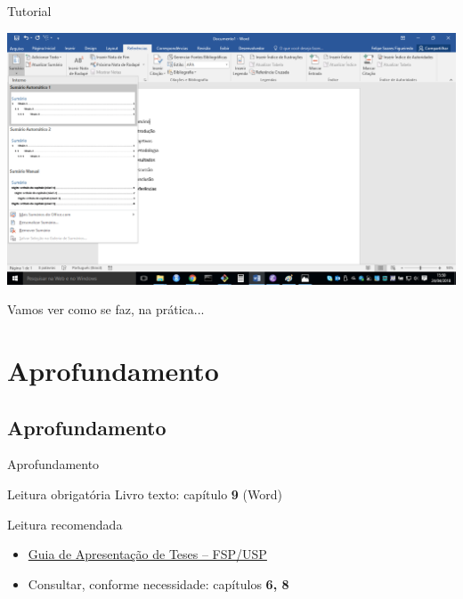 \documentclass{beamer}
\begin{document}
\begin{frame}{\scriptsize Tutorial}
  \begin{center}
    \includegraphics[width=\textwidth]{EstruturaII/sumario2}
  \end{center}
\end{frame}

\begin{frame}{\scriptsize }
  \begin{block}{}
    \Large
    Vamos ver como se faz, na prática...
  \end{block}
\end{frame}

\section{Aprofundamento}

\subsection{Aprofundamento}

\begin{frame}{Aprofundamento}
  \begin{block}{Leitura obrigatória}
    Livro texto: capítulo {\bf 9} (Word)
  \end{block}
  \bigskip
  \begin{block}{Leitura recomendada}
    \begin{itemize}
      \footnotesize
    \item \href{http://www.biblioteca.fsp.usp.br/~biblioteca/guia/i_cap_04.htm}
      {Guia de Apresentação de Teses -- FSP/USP}
    \item Consultar, conforme necessidade: capítulos {\bf 6, 8}
  \end{itemize}
  \end{block}
\end{frame}


\end{document}
